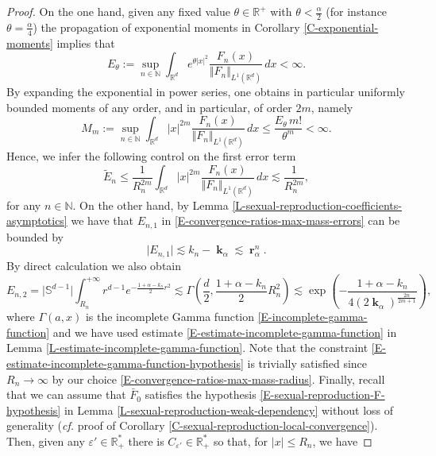 \documentclass[reqno]{amsart}
\DeclareMathOperator{\bk}{\boldsymbol{k}}
\DeclareMathOperator{\br}{\boldsymbol{r}}
\numberwithin{equation}{section}
\begin{document}
{\begin{proof}
On the one hand, given any fixed value $\theta\in \mathbb{R}^+$ with $\theta<\frac{\alpha}{2}$ (for instance $\theta=\frac{\alpha}{4}$) the propagation of exponential moments in Corollary \ref{C-exponential-moments} implies that
$$E_\theta:=\sup_{n\in \mathbb{N}}\int_{\mathbb{R}^d}e^{\theta |x|^2}\frac{F_n(x)}{\Vert F_n\Vert_{L^1(\mathbb{R}^d)}}\,dx<\infty.$$
By expanding the exponential in power series, one obtains in particular uniformly bounded moments of any order, and in particular, of order $2m$, namely
$$M_m:=\sup_{n\in \mathbb{N}}\int_{\mathbb{R}^d}\vert x\vert^{2m}\frac{F_n(x)}{\Vert F_n\Vert_{L^1(\mathbb{R}^d)}}\,dx\leq \frac{E_\theta \,m!}{\theta^m}<\infty.$$
Hence, we infer the following control on the first error term
\begin{equation}\label{E-convergence-ratios-max-mass-errors-1}
\tilde{E}_n\leq \frac{1}{R_n^{2m}}\int_{\mathbb{R}^d}\vert x\vert^{2m}\frac{F_n(x)}{\Vert F_n\Vert_{L^1(\mathbb{R}^d)}}\,dx\lesssim \frac{1}{R_n^{2m}},
\end{equation}
for any $n\in \mathbb{N}$. On the other hand, by Lemma \ref{L-sexual-reproduction-coefficients-asymptotics} we have that $E_{n,1}$ in \eqref{E-convergence-ratios-max-mass-errors} can be bounded by
\begin{equation}\label{E-convergence-ratios-max-mass-errors-2-1}
\vert E_{n,1}\vert\lesssim k_n-\bk_\alpha\lesssim \br_\alpha^n.
\end{equation}
By direct calculation we also obtain
\begin{equation}\label{E-convergence-ratios-max-mass-errors-2-2}
E_{n,2}=\vert \mathbb{S}^{d-1}\vert\int_{R_n}^{+\infty}r^{d-1}e^{-\frac{1+\alpha-k_n}{2}r^2}\lesssim\Gamma\left(\frac{d}{2},\frac{1+\alpha-k_n}{2}R_n^2\right)\lesssim \exp\left(-\frac{1+\alpha-k_n}{4(2\bk_\alpha)^\frac{2n}{2m+1}}\right),
\end{equation}
where $\Gamma(a,x)$ is the incomplete Gamma function \eqref{E-incomplete-gamma-function} and we have used estimate \eqref{E-estimate-incomplete-gamma-function} in Lemma \ref{L-estimate-incomplete-gamma-function}. Note that the constraint \eqref{E-estimate-incomplete-gamma-function-hypothesis} is trivially satisfied since $R_n\rightarrow \infty$ by our choice \eqref{E-convergence-ratios-max-mass-radius}. Finally, recall that we can assume that $\bar F_0$ satisfies the hypothesis \eqref{E-sexual-reproduction-F-hypothesis} in Lemma \ref{L-sexual-reproduction-weak-dependency} without loss of generality ({\em cf.} proof of Corollary \ref{C-sexual-reproduction-local-convergence}). Then, given any $\varepsilon'\in \mathbb{R}_+^*$ there is $C_{\varepsilon'}\in \mathbb{R}_+^*$ so that, for $|x|\leq R_n$, we have

\end{proof}}
\end{document}
